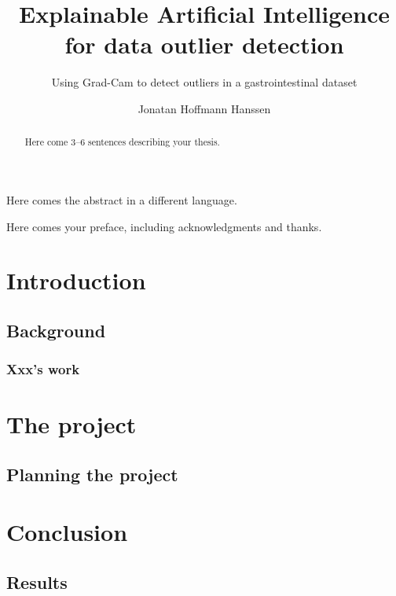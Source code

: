 \documentclass[UKenglish]{uiomasterthesis} %
\title{Explainable Artificial Intelligence for data outlier detection} %
\subtitle{Using Grad-Cam to detect outliers in a gastrointestinal dataset} %
\author{Jonatan Hoffmann Hanssen} %
\begin{document}
\uiomasterfp[dept={Department of Informatics}, %
program={Robotics and Intelligent Systems}, %
supervisors={Hugo Lewi Hammer \and Kyrre Harald Glette}, %
long] %

\frontmatter{}
\begin{abstract}
Here come 3--6 sentences describing your thesis.
\end{abstract}

\begin{xabstract}[Sammendrag] %
Here comes the abstract in a different language.
\end{xabstract}

\tableofcontents{} %
\listoffigures{} %
\listoftables{} %

\begin{preface}
Here comes your preface, including acknowledgments and thanks.
\end{preface}

\mainmatter{}
\part{Introduction} %
\chapter{Background} %
\section{Xxx’s work} %

\part{The project} %
\chapter{Planning the project} %

\part{Conclusion} %
\chapter{Results} %

\backmatter{}
\printbibliography{}
\end{document}
